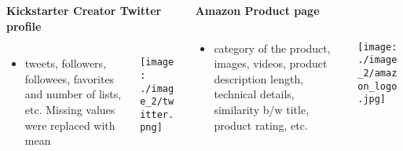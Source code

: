 \documentclass[9pt]{beamer}
\begin{document}
\begin{frame}
\vspace{10pt}

\begin{columns}[T] %
	\begin{column}{.48\textwidth} {\textbf{Kickstarter Creator Twitter profile}}
		\begin{columns}
			\begin{column}{.80\textwidth} 
				\begin{itemize}[label=\textcolor{blue}{\textbullet}]
					\item{\small \text{\textbar}tweets\text{\textbar}, 
						\text{\textbar}followers\text{\textbar},
						\text{\textbar}followees\text{\textbar}, 
						\text{\textbar}favorites and number of lists\text{\textbar}, etc. Missing values were replaced with mean}
				\end{itemize}
			\end{column}		
			
			\begin{column}{.20\textwidth} 
				\texttt{[image: ./image\_2/twitter.png]}
			\end{column}				
		\end{columns}
	\end{column}
	
	
	\begin{column}{.48\textwidth} {\textbf{Amazon Product page}}
		\begin{columns}
			\begin{column}{.70\textwidth} 
				\begin{itemize}[label=\textcolor{blue}{\textbullet}]
					\item{\small category of the product, 
						\text{\textbar}images\text{\textbar}, 
						\text{\textbar}videos\text{\textbar}, 
						product description length,
						technical details,
						similarity b/w title,
						product rating, etc.}
				\end{itemize}
			\end{column}		
			\begin{column}{.30\textwidth}
				\raggedright
				\texttt{[image: ./image\_2/amazon\_logo.jpg]}
			\end{column}				
		\end{columns}
	\end{column}
\end{columns}
\end{frame}
\end{document}
